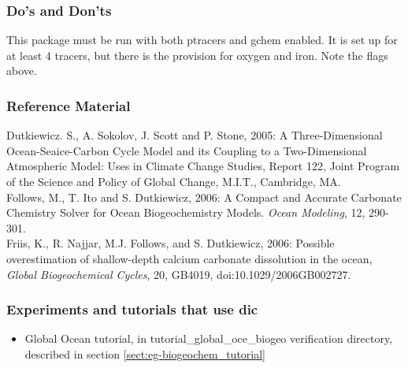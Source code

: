 \subsubsection{Do's and Don'ts}

This package must be run with both ptracers and gchem enabled.
It is set up for at least 4 tracers, but there is the provision for
oxygen and iron. Note the flags above.

\subsubsection{Reference Material}

Dutkiewicz. S., A. Sokolov, J. Scott and P. Stone, 2005:
A Three-Dimensional Ocean-Seaice-Carbon Cycle Model and its Coupling
to a Two-Dimensional Atmospheric Model: Uses in Climate Change Studies,
Report 122, Joint Program of the Science and Policy of Global Change,
M.I.T., Cambridge, MA.
\\

Follows, M., T. Ito and S. Dutkiewicz, 2006:
A Compact and Accurate Carbonate Chemistry Solver for Ocean
Biogeochemistry Models. {\it Ocean Modeling}, 12, 290-301.
\\

Friis, K.,  R. Najjar, M.J. Follows, and S. Dutkiewicz, 2006:
Possible overestimation of shallow-depth calcium carbonate
dissolution in the ocean,
{\it Global Biogeochemical Cycles}, 20, GB4019, doi:10.1029/2006GB002727.
\\


\subsubsection{Experiments and tutorials that use dic}
\label{sec:pkg:dic:experiments}

\begin{itemize}
\item{Global Ocean tutorial, in tutorial\_global\_oce\_biogeo verification directory, 
described in section \ref{sect:eg-biogeochem_tutorial} }
\end{itemize}

